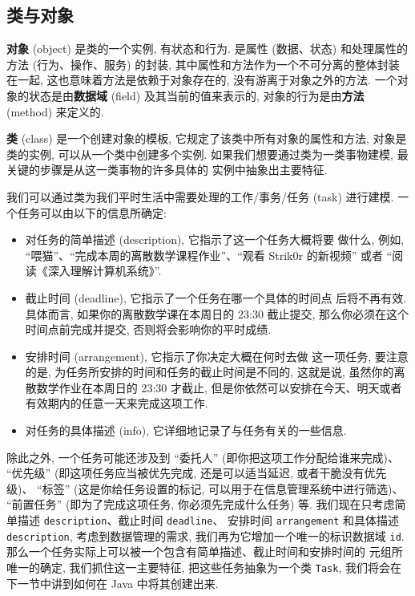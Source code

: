 \documentclass[10pt,UTF8]{book} %
\begin{document}
\subsection{类与对象}

\textbf{对象} (object) 是类的一个实例, 有状态和行为. 是属性 (数据、状态) 和处理属性的方法 
(行为、操作、服务) 的封装, 其中属性和方法作为一个不可分离的整体封装在一起, 
这也意味着方法是依赖于对象存在的, 没有游离于对象之外的方法.
一个对象的状态是由\textbf{数据域} (field) 及其当前的值来表示的,
对象的行为是由\textbf{方法} (method) 来定义的.

\textbf{类} (class) 是一个创建对象的模板, 它规定了该类中所有对象的属性和方法, 
对象是类的实例, 可以从一个类中创建多个实例.
如果我们想要通过类为一类事物建模, 最关键的步骤是从这一类事物的许多具体的
实例中抽象出主要特征.

我们可以通过类为我们平时生活中需要处理的工作/事务/任务 (task) 进行建模. 
一个任务可以由以下的信息所确定:
\begin{itemize}[itemsep=0pt]
    \item 对任务的简单描述 (description), 它指示了这一个任务大概将要
    做什么, 例如, “喂猫”、“完成本周的离散数学课程作业”、“观看 Strik0r 的新视频”
    或者 “阅读《深入理解计算机系统》”.
    \item 截止时间 (deadline), 它指示了一个任务在哪一个具体的时间点
    后将不再有效. 具体而言, 如果你的离散数学课在本周日的 23:30 截止提交,
    那么你必须在这个时间点前完成并提交, 否则将会影响你的平时成绩.
    \item 安排时间 (arrangement), 它指示了你决定大概在何时去做
    这一项任务, 要注意的是, 为任务所安排的时间和任务的截止时间是不同的,
    这就是说, 虽然你的离散数学作业在本周日的 23:30 才截止,
    但是你依然可以安排在今天、明天或者有效期内的任意一天来完成这项工作.
    \item 对任务的具体描述 (info), 它详细地记录了与任务有关的一些信息.
\end{itemize}
除此之外, 一个任务可能还涉及到 “委托人” (即你把这项工作分配给谁来完成)、
“优先级” (即这项任务应当被优先完成, 还是可以适当延迟, 或者干脆没有优先级)、
“标签” (这是你给任务设置的标记, 可以用于在信息管理系统中进行筛选)、
“前置任务” (即为了完成这项任务, 你必须先完成什么任务) 等.
我们现在只考虑简单描述 \lstinline|description|、截止时间 \lstinline|deadline|、
安排时间 \lstinline|arrangement| 和具体描述 \lstinline|description|,
考虑到数据管理的需求, 我们再为它增加一个唯一的标识数据域 \lstinline|id|.
那么一个任务实际上可以被一个包含有简单描述、截止时间和安排时间的
元组所唯一的确定, 我们抓住这一主要特征, 把这些任务抽象为一个类 \lstinline|Task|,
我们将会在下一节中讲到如何在 Java 中将其创建出来.
\end{document}
